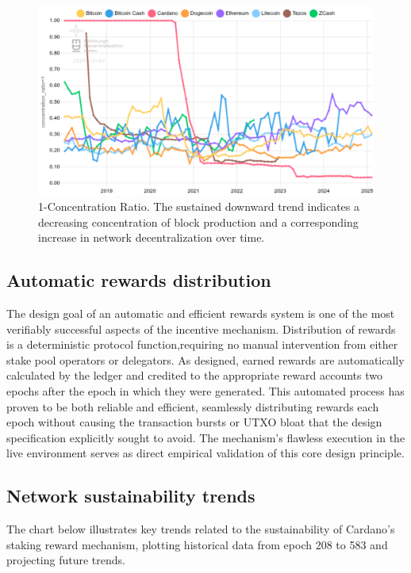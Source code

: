 \documentclass[11pt, letterpaper]{article}
\begin{document}
\begin{figure}[H]
	\centering
	\includegraphics[width=\textwidth]{img/consensus-concentration_ratio=1-chart.png}
	\caption{1-Concentration Ratio. The sustained downward trend indicates a decreasing concentration
		of block production and a corresponding increase in network decentralization over time.}
	\label{fig:k_effective}
\end{figure}

\subsection{Automatic rewards distribution}

The design goal of an automatic and efficient rewards system is one of the most
verifiably successful aspects of the incentive mechanism. Distribution of rewards
is a deterministic protocol function,requiring no manual intervention from either stake pool
operators or delegators. As designed, earned rewards are automatically calculated by the
ledger and credited to the appropriate reward accounts two epochs after the
epoch in which they were generated. This automated process has proven to be
both reliable and efficient, seamlessly distributing rewards each epoch without
causing the transaction bursts or UTXO bloat that the design specification
explicitly sought to avoid. The mechanism's flawless execution in the live
environment serves as direct empirical validation of this core design
principle.

\subsection{Network sustainability trends}

The chart below illustrates key trends related to the sustainability of Cardano's staking reward mechanism, plotting historical data from epoch 208 to 583 and projecting future trends.
\end{document}
